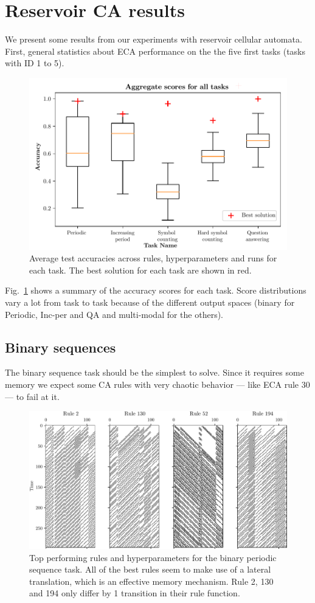 \section{Reservoir \ac{CA} results}
We present some results from our experiments with reservoir cellular automata.
First, general statistics about \ac{ECA} performance on the the five first tasks
(tasks with ID 1 to 5).

\begin{figure}[htbp]
  \centering
  \includegraphics[width=.6\linewidth]{figures/aggregate_results.pdf}
  \caption{Average test accuracies across rules, hyperparameters and runs for
    each task. The best solution for each task are shown in
    red.}\label{fig:aggregate-results}
\end{figure}

Fig.~\ref{fig:aggregate-results} shows a summary of the accuracy scores for each
task. Score distributions vary a lot from task to task because of the different
output spaces (binary for Periodic, Inc-per and QA and multi-modal for the
others).

\subsection{Binary sequences}

The binary sequence task should be the simplest to solve. Since it requires some
memory we expect some CA rules with very chaotic behavior --- like ECA rule 30 ---
to fail at it.

\begin{figure}[htbp]
  \centering
  \includegraphics[width=.6\linewidth]{figures/periodic_top.pdf}
  \caption{Top performing rules and hyperparameters for the binary periodic
    sequence task. All of the best rules seem to make use of a lateral
    translation, which is an effective memory mechanism. Rule 2, 130 and 194
    only differ by 1 transition in their rule
    function.}\label{fig:top-binary-seq}
\end{figure}

